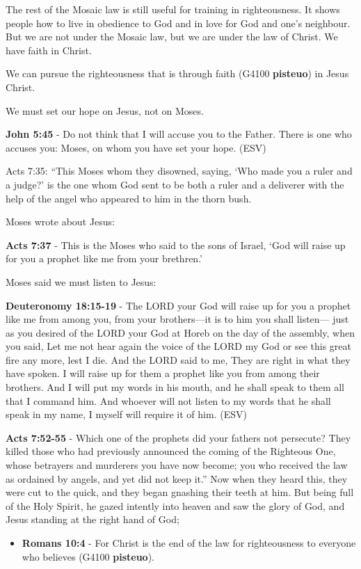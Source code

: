 \documentclass[11pt]{article}
\begin{document}
The rest of the Mosaic law is still useful for training in righteousness. It shows people how to live in obedience to God and in love for God and one's neighbour. But we are not under the Mosaic law, but we are under the law of Christ. We have faith in Christ.

We can pursue the righteousness that is through faith (G4100 \textbf{pisteuo}) in Jesus Christ.

We must set our hope on Jesus, not on Moses.

\textbf{John 5:45} -  Do not think that I will accuse you to the Father.  There is one who accuses you: Moses, on whom you have set your hope.  (ESV)

Acts 7:35: “This Moses whom they disowned, saying, ‘Who made you a ruler and a judge?’ is the one whom God sent to be both a ruler and a deliverer with the help of the angel who appeared to him in the thorn bush.

Moses wrote about Jesus:

\textbf{Acts 7:37} - This is the Moses who said to the sons of Israel, ‘God will raise up for you a prophet like me from your brethren.’

Moses said we must listen to Jesus:

\textbf{Deuteronomy 18:15-19} - The LORD your God will raise up for you a prophet like me from among you, from your brothers—it is to him you shall listen— just as you desired of the LORD your God at Horeb on the day of the assembly, when you said, Let me not hear again the voice of the LORD my God or see this great fire any more, lest I die. And the LORD said to me, They are right in what they have spoken. I will raise up for them a prophet like you from among their brothers. And I will put my words in his mouth, and he shall speak to them all that I command him. And whoever will not listen to my words that he shall speak in my name, I myself will require it of him. (ESV)

\textbf{Acts 7:52-55} - Which one of the prophets did your fathers not persecute? They killed those who had previously announced the coming of the Righteous One, whose betrayers and murderers you have now become; you who received the law as ordained by angels, and yet did not keep it.” Now when they heard this, they were cut to the quick, and they began gnashing their teeth at him.  But being full of the Holy Spirit, he gazed intently into heaven and saw the glory of God, and Jesus standing at the right hand of God;

\begin{itemize}
\item \textbf{Romans 10:4} - For Christ is the end of the law for righteousness to everyone who believes (G4100 \textbf{pisteuo}).
\end{itemize}
\end{document}
